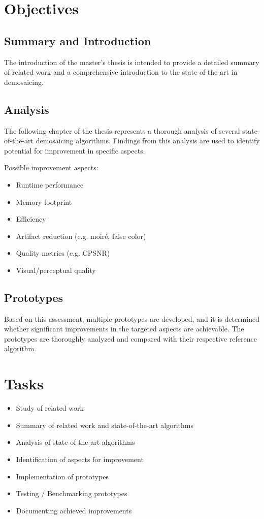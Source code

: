 \documentclass[english,notitlepage,smartquotes]{hgbreport}
\begin{document}
\section{Objectives} %

\subsection{Summary and Introduction}

The introduction of the master's thesis is intended to provide a detailed summary of related work and a comprehensive introduction to the state-of-the-art in demosaicing.

\subsection{Analysis}

The following chapter of the thesis represents a thorough analysis of several state-of-the-art demosaicing algorithms. 
Findings from this analysis are used to identify potential for improvement in specific aspects.

\noindent
Possible improvement aspects:

\begin{itemize}
	\item Runtime performance
	\item Memory footprint
	\item Efficiency
	\item Artifact reduction (e.g. moiré, false color)
	\item Quality metrics (e.g. CPSNR)
	\item Visual/perceptual quality
\end{itemize}

\subsection{Prototypes}

Based on this assessment, multiple prototypes are developed, and it is determined whether significant improvements in the targeted aspects are achievable. 
The prototypes are thoroughly analyzed and compared with their respective reference algorithm.

\section{Tasks}

\begin{itemize}
	\item Study of related work
	\item Summary of related work and state-of-the-art algorithms
	\item Analysis of state-of-the-art algorithms
	\item Identification of aspects for improvement
	\item Implementation of prototypes
	\item Testing / Benchmarking prototypes
	\item Documenting achieved improvements
\end{itemize}
\end{document}
